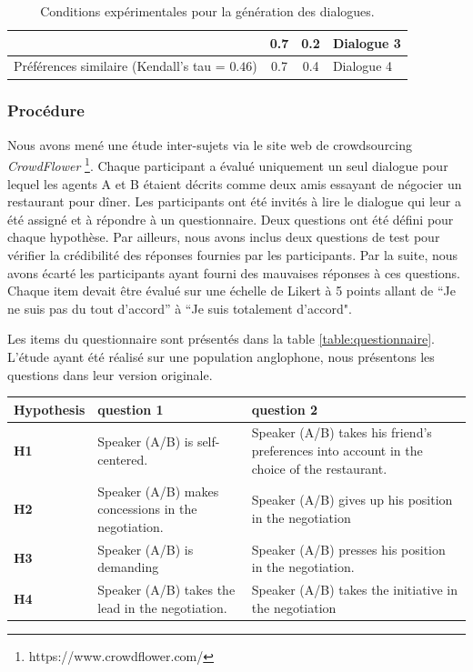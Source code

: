 {\begin{table}[h]
\begin{tabular}{ |l|c|c|l| }
						\newline   &0.7 & 0.2 & Dialogue 3\\ 
						\hline
						\newline Préférences similaire (Kendall's tau = $0.46$) & 0.7 & 0.4 & Dialogue 4\\
						\hline
					\end{tabular}
					\caption{Conditions expérimentales pour la génération des dialogues.} 
					\label{table:conditions}
				\end{table}
		
			\subsubsection{Procédure}
					\label{sec:questionnaire}
					Nous avons mené une étude inter-sujets via le site web de crowdsourcing  \emph {CrowdFlower} \footnote {https://www.crowdflower.com/}.
					Chaque participant a évalué uniquement un seul dialogue pour lequel les agents A et B étaient décrits comme deux amis essayant de négocier un restaurant pour dîner.
					Les participants ont été invités à lire le dialogue qui leur a été assigné et à répondre à un questionnaire.
					Deux questions ont été défini pour chaque hypothèse. Par ailleurs, nous avons inclus deux questions de test pour vérifier la crédibilité des réponses fournies par les participants. Par la suite, nous avons écarté les participants ayant fourni des mauvaises réponses à ces questions. 
					Chaque item devait être évalué sur une échelle de Likert à 5 points allant de ``Je ne suis pas du tout d'accord'' à ``Je suis totalement d'accord".
			
					Les items du questionnaire sont présentés dans la table \ref{table:questionnaire}. L'étude ayant été réalisé sur une population anglophone, nous présentons les questions dans leur version originale. 
						
								\begin{table}[h]
																\centering
								\begin{tabular}{|p{1.75cm}|p{4cm}|p{4.8cm}|}

									\hline
									Hypothesis &question 1& question 2 \\
									\hline
									\textbf{H1} &Speaker (A/B) is self-centered. &Speaker (A/B) takes his friend's preferences into account in the choice of the restaurant.\\
									\hline
									\textbf{H2} &Speaker (A/B) makes concessions in the negotiation.&Speaker (A/B) gives up his position in the negotiation\\
									\hline
									\textbf{H3} & Speaker (A/B) is demanding&Speaker (A/B) presses his position in the negotiation. \\
									\hline
									\textbf{H4} &Speaker (A/B) takes the lead in the negotiation.&Speaker (A/B) takes the initiative in the negotiation \\
									\hline
								\end{tabular}
							

\end{table}}
